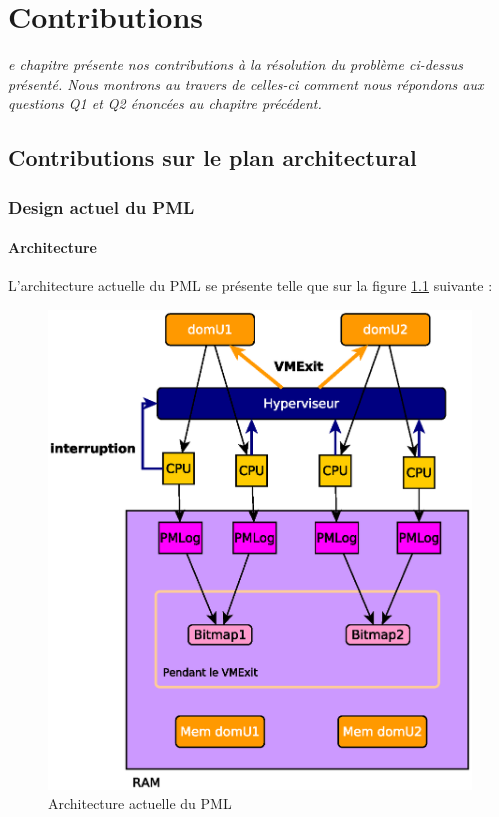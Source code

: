 \let\textcircled=\pgftextcircled
\chapter{Contributions}
\label{chap:contrib}

\textit{e chapitre présente nos contributions à la résolution du problème ci-dessus présenté. Nous montrons au travers de celles-ci comment nous répondons aux questions Q1 et Q2 énoncées au chapitre précédent.}


\newpage  
\section{Contributions sur le plan architectural}

\subsection{Design actuel du PML}
\label{subsection:design_actuel_pml}

\subsubsection{Architecture}
L'architecture actuelle du PML se présente telle que sur la figure \ref{fig:pml_actuel} suivante :
\begin{figure}[H]
    \centering
    \includegraphics[scale=.8]{chapters/3/fig3/PMLactual3}
    \caption{Architecture actuelle du PML}
    \label{fig:pml_actuel}
\end{figure}


